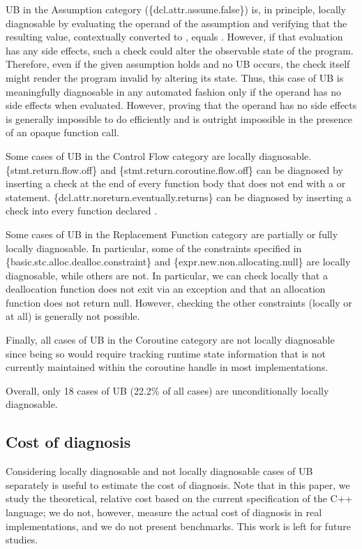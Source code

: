 UB in the Assumption category (\{dcl.attr.assume.false\}) is, in principle, locally diagnosable by evaluating the operand of the assumption and verifying that the resulting value, contextually converted to , equals . However, if that evaluation has any side effects, such a check could alter the observable state of the program. Therefore, even if the given assumption holds and no UB occurs, the check itself might render the program invalid by altering its state. Thus, this case of UB is  meaningfully diagnosable in any automated fashion only if the operand has no side effects when evaluated. However, proving that the operand has no side effects is generally impossible to do efficiently and is outright impossible in the presence of an opaque function call.

Some cases of UB in the Control Flow category are locally diagnosable. \{stmt.return.flow.off\} and \{stmt.return.coroutine.flow.off\} can be diagnosed by inserting a check at the end of every function body that does not end with a  or  statement. \{dcl.attr.noreturn.eventually.returns\} can be diagnosed by inserting a check into every function declared \tcode{[[noreturn]]}.

Some cases of UB in the Replacement Function category are partially or fully locally diagnosable. In particular, some of the constraints specified in \{basic.stc.alloc.dealloc.constraint\} and \{expr.new.non.allocating.null\} are locally diagnosable, while others are not. In particular, we can check locally that a deallocation function does not exit via an exception and that an allocation function does not return null. However, checking the other constraints (locally or at all) is generally not possible.

Finally, all cases of UB in the Coroutine category are not locally diagnosable since being so would require tracking runtime state information that is not currently maintained within the coroutine handle in most implementations.

Overall, only 18 cases of UB (22.2\% of all cases) are unconditionally locally diagnosable.

\subsection{Cost of diagnosis}
\label{cost}

Considering locally diagnosable and not locally diagnosable cases of UB separately is useful to estimate the cost of diagnosis. Note that in this paper, we study the theoretical, relative cost based on the current specification of the C++ language; we do not, however, measure the actual cost of diagnosis in real implementations, and we do not present benchmarks. This work is left for future studies. %

